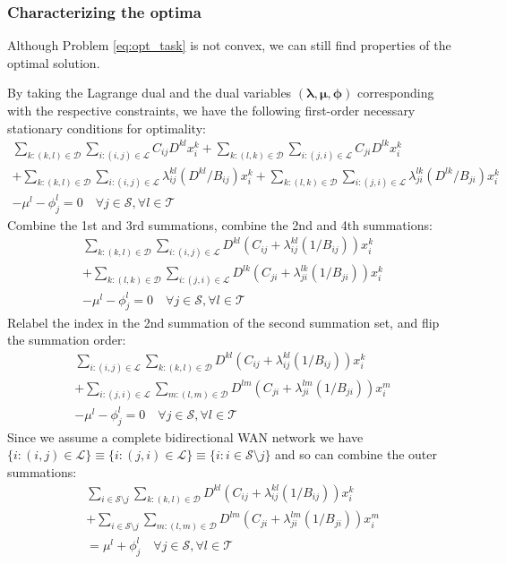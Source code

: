 \subsubsection{Characterizing the optima}
Although Problem \eqref{eq:opt_task} is not convex, we can still find properties of the optimal solution.

By taking the Lagrange dual and the dual variables $(\boldsymbol{\lambda},\boldsymbol{\mu},\boldsymbol{\phi})$ corresponding with the respective constraints, we have the following first-order necessary stationary conditions for optimality:
\begin{align}
	\sum_{k:(k,l)\in\mathcal{D}}\sum_{i:(i,j)\in\mathcal{L}}C_{ij}D^{kl}x_i^k + \sum_{k:(l,k)\in\mathcal{D}}\sum_{i:(j,i)\in\mathcal{L}}C_{ji}D^{lk}x_i^k \nonumber \\
	+ \sum_{k:(k,l)\in\mathcal{D}}\sum_{i:(i,j)\in\mathcal{L}}\lambda_{ij}^{kl}(D^{kl}/B_{ij})x_i^k + \sum_{k:(l,k)\in\mathcal{D}}\sum_{i:(j,i)\in\mathcal{L}}\lambda_{ji}^{lk}(D^{lk}/B_{ji})x_i^k \nonumber \\
	- \mu^l - \phi_j^l = 0
	\quad \forall j\in\mathcal{S},\forall l\in\mathcal{T} \nonumber
\end{align}
Combine the 1st and 3rd summations, combine the 2nd and 4th summations:
\begin{align}
	\sum_{k:(k,l)\in\mathcal{D}}\sum_{i:(i,j)\in\mathcal{L}} D^{kl}(C_{ij} + \lambda_{ij}^{kl}(1/B_{ij}))x_i^k \nonumber \\
	+ \sum_{k:(l,k)\in\mathcal{D}}\sum_{i:(j,i)\in\mathcal{L}} D^{lk}(C_{ji} + \lambda_{ji}^{lk}(1/B_{ji}))x_i^k \nonumber \\
	- \mu^l - \phi_j^l = 0
	\quad \forall j\in\mathcal{S},\forall l\in\mathcal{T} \nonumber
\end{align}
Relabel the index in the 2nd summation of the second summation set, and flip the summation order:
\begin{align}
	\sum_{i:(i,j)\in\mathcal{L}} \sum_{k:(k,l)\in\mathcal{D}} D^{kl}(C_{ij} + \lambda_{ij}^{kl}(1/B_{ij}))x_i^k \nonumber \\
	+ \sum_{i:(j,i)\in\mathcal{L}}\sum_{m:(l,m)\in\mathcal{D}} D^{lm}(C_{ji} + \lambda_{ji}^{lm}(1/B_{ji}))x_i^m \nonumber \\
	- \mu^l - \phi_j^l = 0
	\quad \forall j\in\mathcal{S},\forall l\in\mathcal{T} \nonumber
\end{align}
Since we assume a complete bidirectional WAN network we have $\{i:(i,j)\in\mathcal{L}\} \equiv \{i:(j,i)\in\mathcal{L}\} \equiv \{i:i\in\mathcal{S}\setminus j\}$ and so can combine the outer summations:
\begin{align}\label{eq:cond_stat}
	\sum_{i\in\mathcal{S}\setminus j} \sum_{k:(k,l)\in\mathcal{D}} D^{kl}(C_{ij} + \lambda_{ij}^{kl}(1/B_{ij}))x_i^k \nonumber \\
	+ \sum_{i\in\mathcal{S}\setminus j}\sum_{m:(l,m)\in\mathcal{D}} D^{lm}(C_{ji} + \lambda_{ji}^{lm}(1/B_{ji}))x_i^m \nonumber \\
	= \mu^l + \phi_j^l
	\quad \forall j\in\mathcal{S},\forall l\in\mathcal{T}
\end{align}

